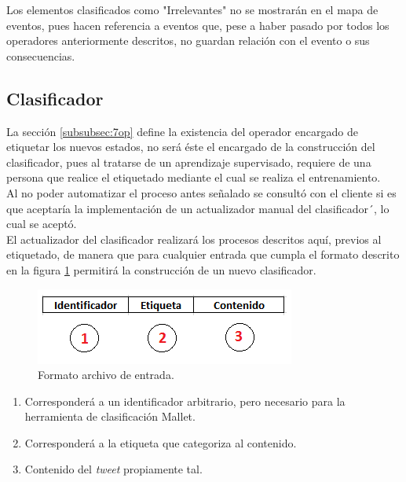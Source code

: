 Los elementos clasificados como "Irrelevantes" no se mostrarán en el mapa de eventos, pues hacen referencia a eventos que, pese a haber pasado por todos los operadores anteriormente descritos, no guardan relación con el evento o sus consecuencias.


\subsection{Clasificador}
\label{sec:clasificador}

La sección \ref{subsubsec:7op} define la existencia del operador encargado de etiquetar los nuevos estados, no será éste el encargado de la construcción del clasificador, pues al tratarse de un aprendizaje supervisado, requiere de una persona que realice el etiquetado mediante el cual se realiza el entrenamiento.\\

Al no poder automatizar el proceso antes señalado se consultó con el cliente si es que aceptaría la implementación de un actualizador manual del clasificador´, lo cual se aceptó.\\

El actualizador del clasificador realizará los procesos descritos aquí, previos al etiquetado, de manera que para cualquier entrada que cumpla el formato descrito en la figura \ref{fig:formatoFig} permitirá la construcción de un nuevo clasificador.\\

\begin{figure}[H]
	\centering
	\captionsetup{justification=centering}
	\includegraphics[scale=0.8]{images/FormatoArchivoEntrada.png}
	\caption[Formato archivo de entrada.]{Formato archivo de entrada.}
	\label{fig:formatoFig}
\end{figure}

\begin{enumerate}
\item Corresponderá a un identificador arbitrario, pero necesario para la herramienta de clasificación Mallet.
\item Corresponderá a la etiqueta que categoriza al contenido.
\item Contenido del \textit{tweet} propiamente tal.
\end{enumerate}

